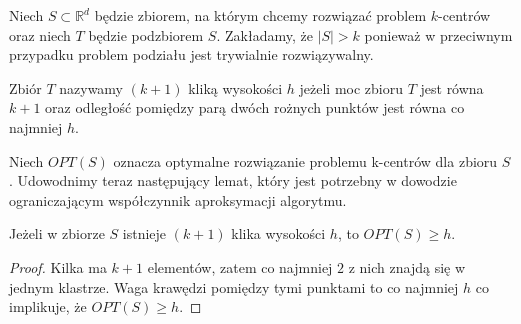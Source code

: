 \noindent
Niech $S \subset \mathbb{R}^{d}$ będzie zbiorem, na którym chcemy rozwiązać problem $k$-centrów oraz niech $T$ będzie podzbiorem $S$.
Zakładamy, że $|S| > k$ ponieważ w przeciwnym przypadku problem podziału jest trywialnie rozwiązywalny.
\begin{definition}
Zbiór $T$ nazywamy $(k+1)$ kliką wysokości $h$ jeżeli moc zbioru $T$ jest równa $k+1$ oraz odległość pomiędzy parą dwóch rożnych punktów jest równa co najmniej $h$. 
\end{definition}

\noindent
Niech $OPT(S)$ oznacza optymalne rozwiązanie problemu k-centrów dla zbioru $S$.
Udowodnimy teraz następujący lemat, który jest potrzebny w dowodzie ograniczającym współczynnik aproksymacji algorytmu.

\begin{lemma}\cite{Gonzalez1985ClusteringTM}
    Jeżeli w zbiorze $S$ istnieje $(k+1)$ klika wysokości $h$, to $OPT(S) \geq h$.
\end{lemma}

\begin{proof}
    Kilka ma $k+1$ elementów, zatem co najmniej $2$ z nich znajdą się w jednym klastrze.
    Waga krawędzi pomiędzy tymi punktami to co najmniej $h$ co implikuje, że $OPT(S) \geq h$.
\end{proof}

